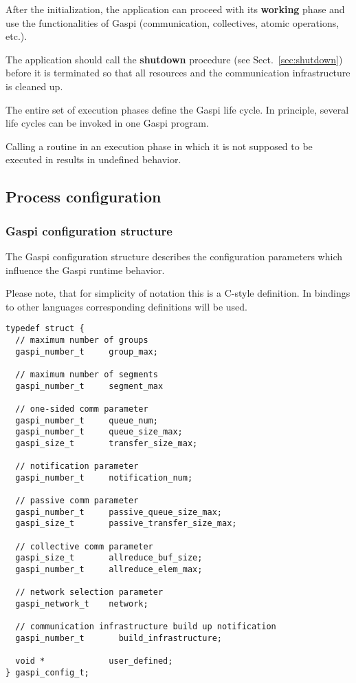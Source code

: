\documentclass[a4paper]{article}
\makeatletter
\newlength{\st}\setlength{\st}{0pt}
\newcommand{\GASPI}{{\sc Gaspi}}
\newcommand{\finalsymb}[1]{\leavevmode\unskip\penalty9999\hbox{}\nobreak\hfill\hskip 1em minus 0.5em\hbox{#1}}
\newcounter{counttodo}
\newlength{\savetabcolsep}
\newlength{\savearrayrulewidth}
\newenvironment{todo}
{\stepcounter{counttodo}
 \typeout{Environment TODO call \thecounttodo}
 \setlength{\savetabcolsep}{\tabcolsep}
 \setlength{\savearrayrulewidth}{\arrayrulewidth}
 \renewcommand{\tabcolsep}{0pt}
 \renewcommand{\arrayrulewidth}{2pt}
 \begin{center}
 \begin{tabular}{c|l@{\hspace*{2em}}|@{\hspace*{2em}}c}
 &
 \begin{minipage}{0.66\textwidth}
 \begin{itemize}
}
{\end{itemize}
 \end{minipage}
 &  todo \#\thecounttodo
 \end{tabular} \marginpar{$\Longleftarrow$}
 \end{center}
 \renewcommand{\tabcolsep}{\savetabcolsep}
 \renewcommand{\arrayrulewidth}{\savearrayrulewidth}
}
\newenvironment{useradvice}{\begin{flushright}\begin{minipage}[t]{0.9\linewidth}\emph{User advice:}}{\finalsymb{$\lrcorner$}\end{minipage}\end{flushright}}
\makeatother
\begin{document}
After the initialization, the application can proceed with its
\textbf{working} phase and use the functionalities of \GASPI{} (communication,
collectives, atomic operations, etc.).

The application should call the
\textbf{shutdown} procedure (see Sect.~\ref{sec:shutdown}) before it is terminated
so that all resources and the communication infrastructure is cleaned up.

The entire set of execution phases define the \GASPI{} life cycle.
In principle, several life cycles can be invoked in one \GASPI{}
program.

Calling a routine in an execution phase in which it is not supposed
to be executed in results in undefined behavior.

\subsection{Process configuration}

\subsubsection{\GASPI{} configuration structure}
\label{subsubsec:confstruct}

The \GASPI{} configuration structure describes the configuration parameters which
influence the \GASPI{} runtime behavior.

Please note, that for simplicity of notation this is a C-style
definition. In bindings to other languages corresponding definitions
will be used.


\begin{lstlisting}[caption=GASPI configuration structure.]
typedef struct {
  // maximum number of groups
  gaspi_number_t     group_max;

  // maximum number of segments
  gaspi_number_t     segment_max

  // one-sided comm parameter
  gaspi_number_t     queue_num;
  gaspi_number_t     queue_size_max;
  gaspi_size_t       transfer_size_max;

  // notification parameter
  gaspi_number_t     notification_num;

  // passive comm parameter
  gaspi_number_t     passive_queue_size_max;
  gaspi_size_t       passive_transfer_size_max;

  // collective comm parameter
  gaspi_size_t       allreduce_buf_size;
  gaspi_number_t     allreduce_elem_max;

  // network selection parameter
  gaspi_network_t    network;

  // communication infrastructure build up notification
  gaspi_number_t       build_infrastructure;

  void *             user_defined;
} gaspi_config_t;
\end{lstlisting}
\end{document}
